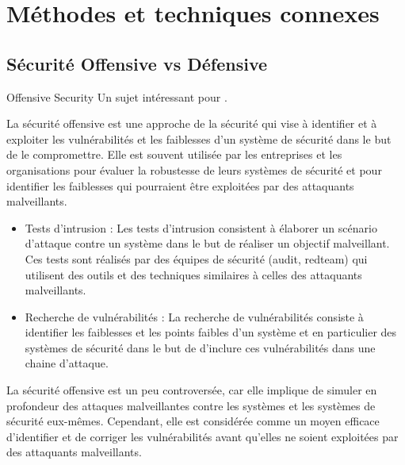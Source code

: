%
%



\section{Méthodes et techniques connexes}

\subsection{Sécurité Offensive vs Défensive}

\begin{techworkbox}{Offensive Security}
Un sujet intéressant pour \fichetech.\end{techworkbox}

La sécurité offensive est une approche de la sécurité qui vise à identifier et à exploiter les vulnérabilités et les faiblesses d'un système de sécurité dans le but de le compromettre. Elle est souvent utilisée par les entreprises et les organisations pour évaluer la robustesse de leurs systèmes de sécurité et pour identifier les faiblesses qui pourraient être exploitées par des attaquants malveillants.

\begin{itemize}
  \item Tests d'intrusion : Les tests d'intrusion consistent à élaborer un scénario d'attaque contre un système  dans le but de réaliser un objectif malveillant. Ces tests sont  réalisés par des équipes de sécurité (audit, redteam) qui utilisent des outils et des techniques similaires à celles des attaquants malveillants.
  \item Recherche de vulnérabilités : La recherche de vulnérabilités consiste à identifier les faiblesses et les points faibles d'un système et en particulier des systèmes de sécurité dans le but de d'inclure ces vulnérabilités dans une chaine d'attaque.
\end{itemize}

La sécurité offensive est un peu controversée, car elle implique de simuler en profondeur des attaques malveillantes contre les systèmes et les systèmes de sécurité eux-mêmes. Cependant, elle est considérée comme un moyen efficace d'identifier et de corriger les vulnérabilités avant qu'elles ne soient exploitées par des attaquants malveillants.

